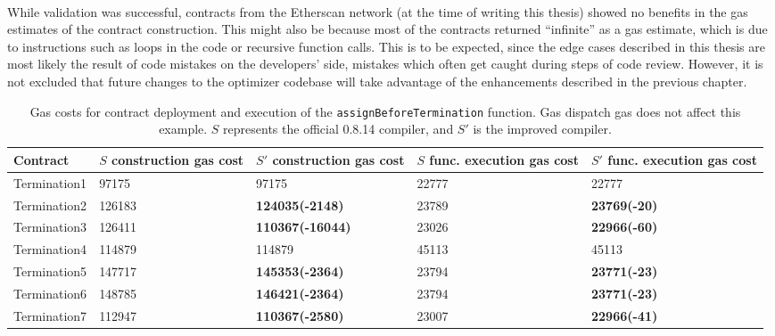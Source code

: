 \paragraph*{}
While validation was successful, contracts from the Etherscan network (at the time of writing this thesis) showed no benefits in the gas estimates of the contract construction. This might also be because most of the contracts returned ``infinite'' as a gas estimate, which is due to instructions such as loops in the code or recursive function calls. This is to be expected, since the edge cases described in this thesis are most likely the result of code mistakes on the developers' side, mistakes which often get caught during steps of code review. However, it is not excluded that future changes to the optimizer codebase will take advantage of the enhancements described in the previous chapter.

\begin{table}
\begin{center}

\begin{tabular}{|p{2.8cm}|p{2.8cm}|p{2.8cm}|p{2.8cm}|p{2.8cm}|}
    \hline
    Contract & $S$ construction gas cost & $S'$ construction gas cost & $S$ func. execution gas cost & $S'$ func. execution gas cost \\ 
    \hline
    Termination1 & 97175 & 97175 & 22777 & 22777 \\  
    \hline
    Termination2 & 126183 & \textbf{124035(-2148)} & 23789 & \textbf{23769(-20)} \\  
    \hline
    Termination3 & 126411 & \textbf{110367(-16044)} & 23026 & \textbf{22966(-60)}\\  
    \hline
    Termination4 & 114879 & 114879 & 45113 & 45113 \\  
    \hline
    Termination5 & 147717 & \textbf{145353(-2364)} & 23794 & \textbf{23771(-23)} \\  
    \hline
    Termination6 & 148785 & \textbf{146421(-2364)} & 23794 & \textbf{23771(-23)} \\  
    \hline
    Termination7 & 112947 & \textbf{110367(-2580)} & 23007 & \textbf{22966(-41)} \\  
    \hline
\end{tabular}
\end{center}
\caption{\label{table:test-suite} Gas costs for contract deployment and execution of the \lstinline[columns=fixed]{assignBeforeTermination} function. Gas dispatch gas does not affect this example. $S$ represents the official 0.8.14 compiler, and $S'$ is the improved compiler.}
\end{table}


